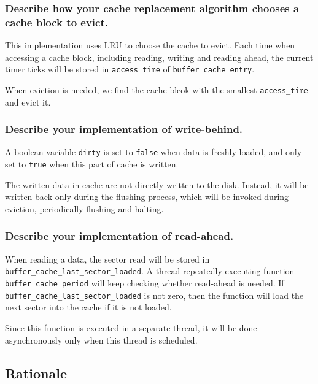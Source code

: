 \documentclass[sigconf, nonacm, balance=false, urlbreakonhyphens=true]{acmart}
\begin{document}
            \subsubsection{Describe how your cache replacement algorithm chooses a cache block to evict. } 

                This implementation uses LRU to choose the cache to evict. Each time when accessing a cache block, including reading, writing and reading ahead, the current timer ticks will be stored in \texttt{access\_time} of \texttt{buffer\_cache\_entry}. 
                
                When eviction is needed, we find the cache blcok with the smallest \texttt{access\_time} and evict it. 

            \subsubsection{Describe your implementation of write-behind. }

                A boolean variable \texttt{dirty} is set to \texttt{false} when data is freshly loaded, and only set to \texttt{true} when this part of cache is written. 

                The written data in cache are not directly written to the disk. Instead, it will be written back only during the flushing process, which will be invoked during eviction, periodically flushing and halting. 

            \subsubsection{Describe your implementation of read-ahead. }

                When reading a data, the sector read will be stored in \\ \texttt{buffer\_cache\_last\_sector\_loaded}. A thread repeatedly executing function \texttt{buffer\_cache\_period} will keep checking whether read-ahead is needed. If \texttt{buffer\_cache\_last\_sector\_loaded} is not zero, then the function will load the next sector into the cache if it is not loaded. 

                Since this function is executed in a separate thread, it will be done asynchronously only when this thread is scheduled. 
        
        \subsection{Rationale}
\end{document}
